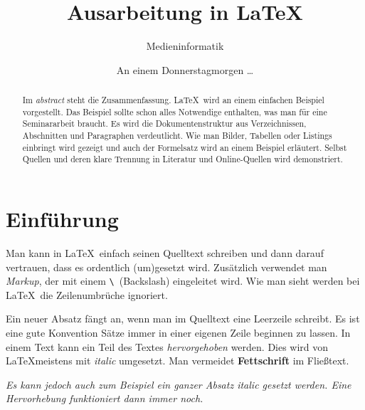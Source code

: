 \documentclass[11pt,a4paper]{article} %
\title{Ausarbeitung in \LaTeX}
\author{Medieninformatik}
\date{An einem Donnerstagmorgen \ldots } %
\begin{document}
\maketitle %

\begin{abstract}
Im \emph{abstract} steht die Zusammenfassung.
\LaTeX\ wird an einem einfachen Beispiel vorgestellt. 
Das Beispiel sollte schon alles Notwendige enthalten, 
was man für eine Seminararbeit braucht. 
Es wird die Dokumentenstruktur aus Verzeichnissen, Abschnitten
und Paragraphen verdeutlicht. 
Wie man Bilder, Tabellen oder Listings einbringt wird gezeigt und 
auch der Formelsatz wird an einem Beispiel erläutert. 
Selbst Quellen und deren klare Trennung in Literatur und Online-Quellen
wird demonstriert.
\end{abstract}

\tableofcontents %
\newpage %

\section{Einführung} \label{sec:einf} 

Man kann in \LaTeX\ einfach %
seinen Quelltext schreiben und dann darauf vertrauen, dass es ordentlich 
(um)gesetzt wird. 
Zusätzlich verwendet man \emph{Markup}, der mit einem 
\verb|\|~(Backslash) eingeleitet wird.
Wie man sieht werden bei \LaTeX\ die Zeilenumbrüche ignoriert.

Ein neuer Absatz fängt an, wenn man im Quelltext eine Leerzeile schreibt.
Es ist eine gute Konvention Sätze immer in einer eigenen Zeile beginnen zu lassen.
In einem Text kann ein Teil des Textes \emph{hervorgehoben} werden.
Dies wird von \LaTeX meistens mit \textit{italic} umgesetzt. 
Man vermeidet \textbf{Fettschrift} im Fließtext.

\textit{
Es kann jedoch auch zum Beispiel ein ganzer Absatz \textit{italic} gesetzt
werden. 
Eine \emph{Hervorhebung} funktioniert dann immer noch.
}
\end{document}
